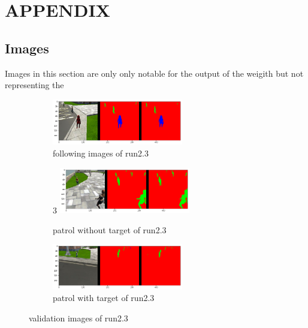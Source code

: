 \documentclass[paper=a4, fontsize=11pt]{scrartcl} %
\numberwithin{equation}{section} %
\numberwithin{figure}{section} %
\numberwithin{table}{section} %
\begin{document}
\section{APPENDIX}\label{appendix}

\subsection{Images}
Images in this section are only only notable for the output of the weigith but not representing the 

\begin{figure}[ht]
	\begin{subfigure}{0.33\textwidth}
	\includegraphics[width=0.9\linewidth, height=2cm]{./imgs/following_images23.png} 
	\caption{following images of run2.3}
	\label{fig:subfollowing_images23}
	\end{subfigure}
	\begin{subfigure}{0.33\textwidth}3
	\includegraphics[width=0.9\linewidth, height=2cm]{./imgs/patrol_non_targ23.png}
	\caption{patrol without target of run2.3}
	\label{fig:subpatrol_non_targ23}
	\end{subfigure}
	\begin{subfigure}{0.33\textwidth}
	\includegraphics[width=0.9\linewidth, height=2cm]{./imgs/patrol_with_targ23.png}
	\caption{patrol with target of run2.3}
	\label{fig:subpatrol_with_targ23}
	\end{subfigure}

	\caption{validation images of run2.3}
	\label{fig:outputimages23}
\end{figure}
\end{document}
